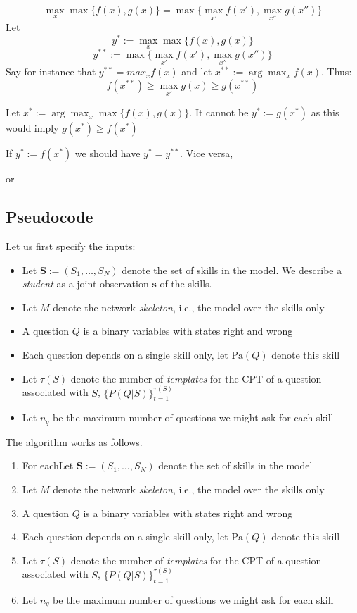 \documentclass[runningheads]{llncs}
\begin{document}
	\begin{theorem}
		\begin{equation}
			\max_{x}  \max \{ f(x) , g(x) \}  
			=
			\max \{ \max_{x'} f(x') , \max_{x''} g(x'') \} 
		\end{equation}
		Let 
		$$y^{*}:=\max_x \max\{f(x),g(x)\}$$
		$$y^{**}:= \max \{ \max_{x'} f(x') , \max_{x''} g(x'') \}$$
		Say for instance that $y^{**}=max_x f(x)$ and let $x^{**}:=\arg\max_x f(x)$. Thus:
		$$f(x^{**})\geq \max_{x'} g(x) \geq g(x^{**})$$ 
		
		Let $x^{*}:= \arg\max_x \max\{f(x),g(x)\}$. 
		It cannot be $y^{*}:=g(x^{*})$ as this would imply $g(x^{*}) \geq f(x^{*})$ 
		
		
		
		
		If $y^{*}:=f(x^{*})$ we should have $y^{*}=y^{**}$.
		Vice versa, 
		
		or
	\end{theorem}
	
	
	
	\subsection*{Pseudocode}
	Let us first specify the inputs:
	\begin{itemize}
		\item Let $\bm{S}:=(S_1,\ldots,S_N)$ denote the set of skills in the model. We 
		describe a \emph{student} as a joint observation $\bm{s}$ of the skills.
		\item Let $M$ denote the network \emph{skeleton}, i.e., the model over the skills only
		\item A question $Q$ is a binary variables with states right and wrong
		\item Each question depends on a single skill only, let $\mathrm{Pa}(Q)$ denote this 
		skill
		\item Let $\tau(S)$ denote the number of \emph{templates} for the CPT of a question 
		associated with $S$, $\{P(Q|S)\}_{t=1}^{\tau(S)}$ 
		\item Let $n_q$ be the maximum number of questions we might ask for each skill
	\end{itemize}
	The algorithm works as follows.
	\begin{enumerate}
		\item For eachLet $\bm{S}:=(S_1,\ldots,S_N)$ denote the set of skills in the model
		\item Let $M$ denote the network \emph{skeleton}, i.e., the model over the skills only
		\item A question $Q$ is a binary variables with states right and wrong
		\item Each question depends on a single skill only, let $\mathrm{Pa}(Q)$ denote this 
		skill
		\item Let $\tau(S)$ denote the number of \emph{templates} for the CPT of a question 
		associated with $S$, $\{P(Q|S)\}_{t=1}^{\tau(S)}$ 
		\item Let $n_q$ be the maximum number of questions we might ask for each skill
	\end{enumerate}
	
\end{document}
